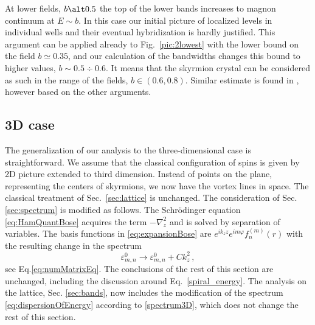 \documentclass[aps,prb,twocolumn,superscriptaddress,nobalancelastpage]{revtex4-1}
\begin{document}
 At lower fields, $b\alt 0.5$   the top of the lower bands increases to magnon continuum at $E\sim b$.  In this case our initial picture of localized levels in individual wells and their eventual hybridization is hardly justified. This argument can be applied already to Fig.\ \ref{pic:2lowest} with the lower bound on the field $b\simeq 0.35$, and our calculation of the bandwidths changes this bound to higher values,  $b\sim 0.5 \div 0.6$. It means that the skyrmion crystal can be considered as such in the range of the fields, $b \in (0.6,0.8)$. Similar estimate is found in \cite{Schutte2014}, however based on the other arguments. 
 
\subsection{3D case 
\label{sec:3d}}

 The generalization of our analysis to the three-dimensional case is straightforward. We assume that the classical configuration of spins is given by 2D picture extended to third dimension. Instead of points on the plane, representing the centers of skyrmions, we now have the vortex lines in space. The classical treatment of Sec.\ \ref{sec:lattice} is unchanged. The consideration of Sec. \ref{sec:spectrum} is modified as follows.  The  Schr\"odinger equation \eqref{eq:HamQuantBose} acquires the term $-\nabla_{z}^{2}$   and is   solved by separation of variables. The basis functions in  \eqref{eq:expansionBose} are $e^{ik_{z} z} e^{im\varphi } f_{n}^{(m)}( r )$ with the resulting change in the spectrum  
 \begin{equation}
 \varepsilon^0_{m,n} \to \varepsilon^0_{m,n} + C k_{z}^{2} \,,
 \label{spectrum3D}
 \end{equation} see Eq.\eqref{eq:numMatrixEq}. The conclusions of the rest of this section are unchanged, including the discussion around Eq.\ \eqref{spiral_energy}.  The analysis on the lattice, Sec. \ref{sec:bands}, now includes the  modification of the spectrum \eqref{eq:dispersionOfEnergy} according to \eqref{spectrum3D}, which does not change the rest of this section. 
 
\end{document}
